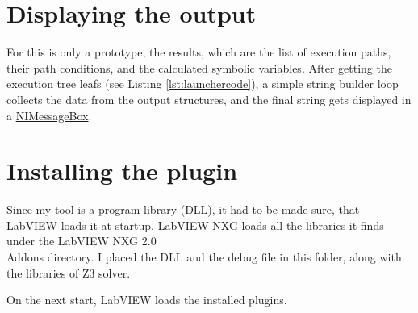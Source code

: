 \section{Displaying the output}
For this is only a prototype, the results, which are the list of execution paths, their path conditions, and the calculated symbolic variables. After getting the execution tree leafs (see Listing \ref{lst:launchercode}), a simple string builder loop collects the data from the output structures, and the final string gets displayed in a \underline{NIMessageBox}.

\section{Installing the plugin}
Since my tool is a program library (DLL), it had to be made sure, that LabVIEW loads it at startup. LabVIEW NXG loads all the libraries it finds under the LabVIEW NXG 2.0\\Addons directory. I placed the DLL and the debug file in this folder, along with the libraries of Z3 solver.

On the next start, LabVIEW loads the installed plugins.